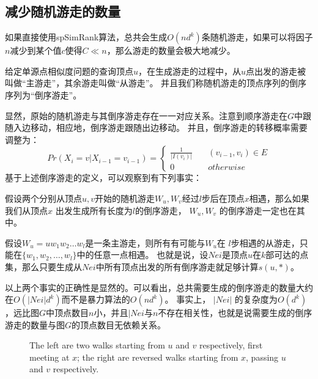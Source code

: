 \documentclass[master]{njuthesis}
\begin{document}
\subsection{减少随机游走的数量}
如果直接使用spSimRank算法，总共会生成$O(nd^k)$条随机游走，如果可以将因子$n$减少到某个值$c$使得$C \ll n$，那么游走的数量会极大地减少。
\begin{definition}[倒序游走]
 给定单源点相似度问题的查询顶点$u$，在生成游走的过程中，从$u$点出发的游走被叫做“主游走”，其余游走叫做“从游走”。 
 并且我们称随机游走的顶点序列的倒序序列为“倒序游走”。
\end{definition}
显然，原始的随机游走与其倒序游走存在一一对应关系。注意到顺序游走在$G$中跟随入边移动，相应地，倒序游走跟随出边移动。
并且，倒序游走的转移概率需要调整为：
\begin{equation}
Pr(X_i=v|X_{i-1}=v_{i-1}) = \left\{
        \begin{array}{ll}
	\frac{1}{|I(v_{i})|} & \quad (v_{i-1}, v_i) \in E \\
	0  &\quad otherwise
        \end{array}
    \right.
	\label{eq:eight}
\end{equation}
基于上述倒序游走的定义，可以观察到有下列事实：
\begin{fact}
假设两个分别从顶点$u, v$开始的随机游走$W_u, W_v$经过$l$步后在顶点$x$相遇，那么如果我们从顶点$x$ 出发生成所有长度为$l$的倒序游走，
$W_u, W_v$ 的倒序游走一定也在其中。
\end{fact}
\begin{fact}
 假设$W_u=uw_1w_2\dots w_l$是一条主游走，则所有有可能与$W_u$在 $l$步相遇的从游走，只能在$\{w_1, w_2, \dots, w_l\}$中的任意一点相遇。
 也就是说，设$Nei$是顶点$u$在$k$部可达的点集，那么只要生成从$Nei$中所有顶点出发的所有倒序游走就足够计算$s(u,*)$。
\end{fact}
以上两个事实的正确性是显然的。可以看出，总共需要生成的倒序游走的数量大约在$O(|Nei|d^k)$而不是暴力算法的$O(nd^k)$。
事实上， $|Nei|$ 的复杂度为$O(d^k)$，远比图$G$中顶点数目$n$小，并且$|Nei$与$n$不存在相关性，也就是说需要生成的倒序游走的数量与图$G$的顶点数目无依赖关系。
\iffalse
\begin{figure}[h]
\centering
\label{fig:graph1}
\resizebox{!}{!}{}
\caption{The left are two walks starting from $u$ and $v$ respectively, first meeting at $x$; the right are reversed walks starting from $x$, passing $u$ and $v$ respectively.}\label{fig:one}
\end{figure}
\end{document}
